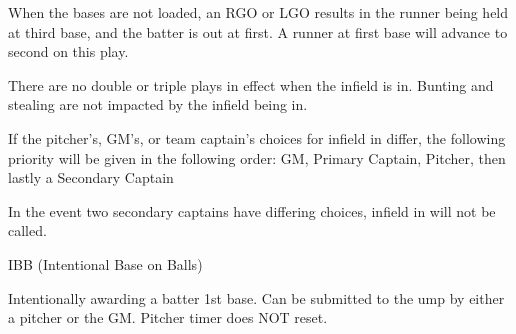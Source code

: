 \begin{deepEnumerate}
\begin{deepEnumerate}
        \item When the bases are not loaded, an RGO or LGO results in the runner being held at third base, and the batter is out at first. 
        A runner at first base will advance to second on this play.
        \item There are no double or triple plays in effect when the infield is in. 
        Bunting and stealing are not impacted by the infield being in.
        \item If the pitcher’s, GM’s, or team captain’s choices for infield in differ, 
        the following priority will be given in the following order: 
        GM, Primary Captain, Pitcher, then lastly a Secondary Captain
        \begin{deepEnumerate}
            \item In the event two secondary captains have differing choices, infield in will not be called.
        \end{deepEnumerate}
    \end{deepEnumerate}
    \item IBB (Intentional Base on Balls)
    \begin{deepEnumerate}
        \item Intentionally awarding a batter 1st base. 
        Can be submitted to the ump by either a pitcher or the GM. 
        Pitcher timer does NOT reset.
    \end{deepEnumerate}
\end{deepEnumerate}
